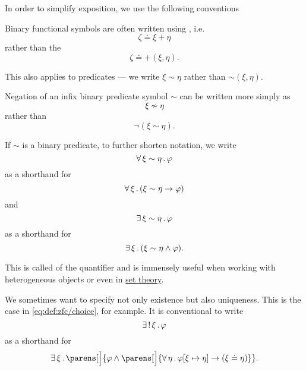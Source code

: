 \begin{remark}\label{rem:first_order_formula_conventions}
  In order to simplify exposition, we use the following conventions
  \begin{thmenum}
     Binary functional symbols are often written using , i.e.
    \begin{equation*}
      \zeta \doteq \xi + \eta
    \end{equation*}
    rather than the 
    \begin{equation*}
      \zeta \doteq +(\xi, \eta).
    \end{equation*}

    This also applies to predicates --- we write \( \xi \sim \eta \) rather than \( \sim(\xi, \eta) \).

     Negation of an infix binary predicate symbol \( \sim \) can be written more simply as
    \begin{equation*}
      \xi \not\sim \eta
    \end{equation*}
    rather than
    \begin{equation*}
      \neg(\xi \sim \eta).
    \end{equation*}

     If \( \sim \) is a binary predicate, to further shorten notation, we write
    \begin{equation*}
      \forall \thinspace \xi \sim \eta \thinspace . \thinspace \varphi
    \end{equation*}
    as a shorthand for
    \begin{equation*}
      \forall \thinspace \xi \thinspace . \thinspace (\xi \sim \eta \rightarrow \varphi)
    \end{equation*}
    and
    \begin{equation*}
      \exists \thinspace \xi \sim \eta \thinspace . \thinspace \varphi
    \end{equation*}
    as a shorthand for
    \begin{equation*}
      \exists \thinspace \xi \thinspace . \thinspace (\xi \sim \eta \wedge \varphi).
    \end{equation*}

    This is called  of the quantifier and is immensely useful when working with heterogeneous objects or even in \hyperref[sec:set_theory]{set theory}.

     We sometimes want to specify not only existence but also uniqueness. This is the case in \eqref{eq:def:zfc/choice}, for example. It is conventional to write
    \begin{equation*}
      \exists \thinspace ! \thinspace \xi \thinspace . \thinspace \varphi
    \end{equation*}
    as a shorthand for
    \begin{equation*}
      \qexists \xi \parens[\Big]{ \varphi \wedge \parens[\Big]{ \qforall \eta \varphi[\xi \mapsto \eta] \rightarrow (\xi \doteq \eta) } }.
    \end{equation*}


\end{thmenum}
\end{remark}
